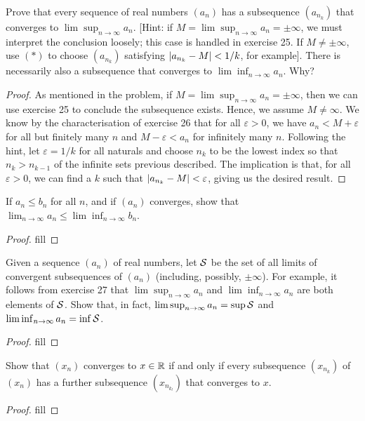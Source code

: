 \begin{exercise}{27}
Prove that every sequence of real numbers $(a_n)$ has a subsequence $(a_{n_k})$ that converges to $\lim\sup_{n\to\infty}a_n$. [Hint: if $M=\lim\sup_{n\to\infty}a_n=\pm\infty$, we must interpret the conclusion loosely; this case is handled in exercise 25. If $M\neq\pm\infty$, use $(\ast)$ to choose $(a_{n_k})$ satisfying $\left\lvert a_{n_k}-M\right\rvert<1/k$, for example]. There is necessarily also a subsequence that converges to $\lim\inf_{n\to\infty}a_n$. Why?
\end{exercise}
\begin{proof}
As mentioned in the problem, if $M=\lim\sup_{n\to\infty}a_n=\pm\infty$, then we can use exercise 25 to conclude the subsequence exists. Hence, we assume $M\neq\infty$. We know by the characterisation of exercise 26 that for all $\varepsilon>0$, we have $a_n<M+\varepsilon$ for all but finitely many $n$ and $M-\varepsilon<a_n$ for infinitely many $n$. Following the hint, let $\varepsilon=1/k$ for all naturals and choose $n_k$ to be the lowest index so that $n_k>n_{k-1}$ of the infinite sets previous described. The implication is that, for all $\varepsilon>0$, we can find a $k$ such that $\left\lvert a_{n_k}-M\right\rvert<\varepsilon$, giving us the desired result.
\end{proof}

\begin{exercise}{30}
If $a_n\leq b_n$ for all $n$, and if $(a_n)$ converges, show that $\lim_{n\to\infty}a_n\leq\lim\inf_{n\to\infty}b_n$.
\end{exercise}
\begin{proof}
fill
\end{proof}

\begin{exercise}{32}
Given a sequence $(a_n)$ of real numbers, let $\mathcal{S}$ be the set of all limits of convergent subsequences of $(a_n)$ (including, possibly, $\pm\infty$). For example, it follows from exercise 27 that $\lim\sup_{n\to\infty}a_n$ and $\lim\inf_{n\to\infty}a_n$ are both elements of $\mathcal{S}$. Show that, in fact, $\lim\sup_{n\to\infty}a_n= \sup\mathcal{S}$ and $\lim\inf_{n\to\infty}a_n= \inf\mathcal{S}$.
\end{exercise}
\begin{proof}
fill
\end{proof}

\begin{exercise}{33}
Show that $(x_n)$ converges to $x\in\mathbb{R}$ if and only if every subsequence $(x_{n_k})$ of $(x_n)$ has a further subsequence $(x_{n_{k_l}})$ that converges to $x$.
\end{exercise}
\begin{proof}
fill
\end{proof}

